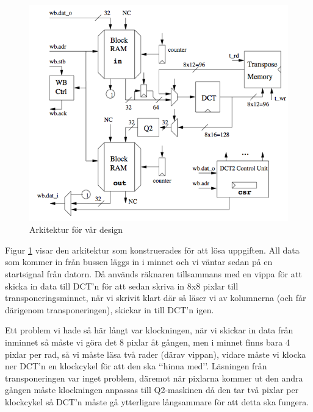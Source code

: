 \documentclass[a4paper]{article}
\begin{document}
\begin{figure}[h]
\centering
\includegraphics[scale=0.5]{architecture.png}
\caption{Arkitektur för vår design}
\label{fig:architecture}
\end{figure}

Figur \ref{fig:architecture} visar den arkitektur som konstruerades för att lösa uppgiften. All data som kommer in från bussen läggs in i minnet och vi väntar sedan på en startsignal från datorn. Då används räknaren tillsammans med en vippa för att skicka in data till DCT\rq{}n för att sedan skriva in 8x8 pixlar till transponeringsminnet, när vi skrivit klart där så läser vi av kolumnerna (och får därigenom transponeringen), skickar in till DCT\rq{}n igen.

Ett problem vi hade så här långt var klockningen, när vi skickar in data från inminnet så måste vi göra det 8 pixlar åt gången, men i minnet finns bara 4 pixlar per rad, så vi måste läsa två rader (därav vippan), vidare måste vi klocka ner DCT\rq{}n en klockcykel för att den ska \lq\lq{}hinna med\rq\rq{}. Läsningen från transponeringen var inget problem, däremot när pixlarna kommer ut den andra gången måste klockningen anpassas till Q2-maskinen då den tar två pixlar per klockcykel så DCT\rq{}n måste gå ytterligare långsammare för att detta ska fungera.
\end{document}
